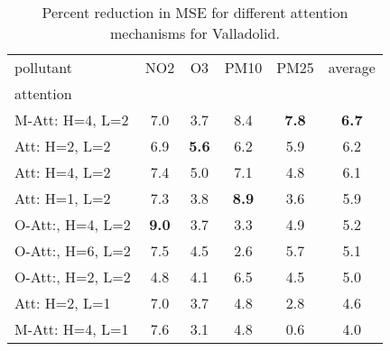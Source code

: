 \begin{table}
\begin{center}
\begin{tabular}{lccccc}
\toprule
pollutant & NO2 & O3 & PM10 & PM25 & average \\
attention &  &  &  &  &  \\
\midrule
M-Att: H=4, L=2 & 7.0 & 3.7 & 8.4 & \textbf{7.8} & \textbf{6.7} \\
Att: H=2, L=2 & 6.9 & \textbf{5.6} & 6.2 & 5.9 & 6.2 \\
Att: H=4, L=2 & 7.4 & 5.0 & 7.1 & 4.8 & 6.1 \\
Att: H=1, L=2 & 7.3 & 3.8 & \textbf{8.9} & 3.6 & 5.9 \\
O-Att:, H=4, L=2 & \textbf{9.0} & 3.7 & 3.3 & 4.9 & 5.2 \\
O-Att:, H=6, L=2 & 7.5 & 4.5 & 2.6 & 5.7 & 5.1 \\
O-Att:, H=2, L=2 & 4.8 & 4.1 & 6.5 & 4.5 & 5.0 \\
Att: H=2, L=1 & 7.0 & 3.7 & 4.8 & 2.8 & 4.6 \\
M-Att: H=4, L=1 & 7.6 & 3.1 & 4.8 & 0.6 & 4.0 \\
\bottomrule
\end{tabular}
\end{center}
\caption{Percent reduction in MSE for different attention mechanisms for Valladolid.}
\label{tab:MSEGainByCityValladolid}
\end{table}
